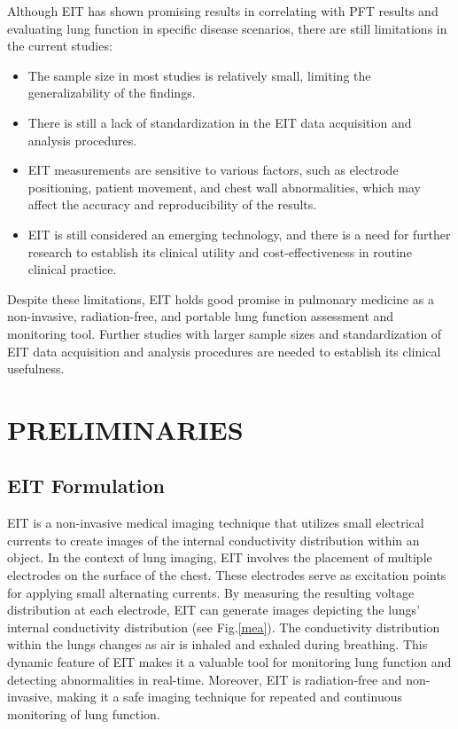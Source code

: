 \documentclass[journal,twoside,web]{ieeecolor}
\begin{document}
Although EIT has shown promising results in correlating with PFT results and evaluating lung function in specific disease scenarios, there are still limitations in the current studies:
\begin{itemize}
	\item The sample size in most studies is relatively small, limiting the generalizability of the findings.
	\item There is still a lack of standardization in the EIT data acquisition and analysis procedures.
	\item EIT measurements are sensitive to various factors, such as electrode positioning, patient movement, and chest wall abnormalities, which may affect the accuracy and reproducibility of the results.
	\item EIT is still considered an emerging technology, and there is a need for further research to establish its clinical utility and cost-effectiveness in routine clinical practice.
\end{itemize}
Despite these limitations, EIT holds good promise in pulmonary medicine as a non-invasive, radiation-free, and portable lung function assessment and monitoring tool. Further studies with larger sample sizes and standardization of EIT data acquisition and analysis procedures are needed to establish its clinical usefulness.

\section{PRELIMINARIES}
\label{pre}
\subsection{EIT Formulation}
\label{EIT}
EIT is a non-invasive medical imaging technique that utilizes small electrical currents to create images of the internal conductivity distribution within an object. In the context of lung imaging, EIT involves the placement of multiple electrodes on the surface of the chest. These electrodes serve as excitation points for applying small alternating currents. By measuring the resulting voltage distribution at each electrode, EIT can generate images depicting the lungs' internal conductivity distribution (see Fig.\ref{mea}). The conductivity distribution within the lungs changes as air is inhaled and exhaled during breathing. This dynamic feature of EIT makes it a valuable tool for monitoring lung function and detecting abnormalities in real-time. Moreover, EIT is radiation-free and non-invasive, making it a safe imaging technique for repeated and continuous monitoring of lung function.
\end{document}
